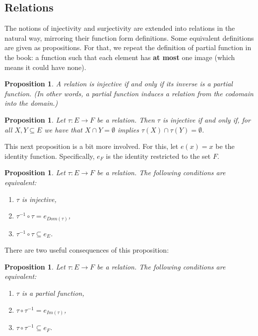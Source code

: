 \documentclass[11pt]{article}
\theoremstyle{plain}
\newtheorem{freeprop}[definition]{Proposition}
\theoremstyle{nonumberplain}
\newcommand{\inv}[1]{{#1}^{-1}}
\begin{document}
\subsection{Relations}

The notions of injectivity and surjectivity are extended into relations in the natural way, mirroring their function form definitions. Some equivalent definitions are given as propositions. For that, we repeat the definition of partial function in the book: a function such that each element has \textbf{at most} one image (which means it could have none).

\begin{freeprop}
    A relation is injective if and only if its inverse is a partial function. (In other words, a partial function induces a relation from the codomain into the domain.)
\end{freeprop}

\begin{freeprop}
    Let $\tau : E \to F$ be a relation. Then $\tau$ is injective if and only if, for all $X, Y \subseteq E$ we have that $X \cap Y = \emptyset$ implies $\tau(X) \cap \tau(Y) = \emptyset$.
\end{freeprop}

This next proposition is a bit more involved. For this, let $e(x) = x$ be the identity function. Specifically, $e_F$ is the identity restricted to the set $F$.

\begin{freeprop}
    Let $\tau : E \to F$ be a relation. The following conditions are equivalent: \begin{enumerate}
        \item $\tau$ is injective,
        \item $\inv \tau \circ \tau = e_{Dom(\tau)}$,
        \item $\inv \tau \circ \tau \subseteq e_E$.
    \end{enumerate}
\end{freeprop}

There are two useful consequences of this proposition:

\begin{freeprop}
    Let $\tau : E \to F$ be a relation. The following conditions are equivalent: \begin{enumerate}
        \item $\tau$ is a partial function,
        \item $\tau \circ \inv \tau = e_{Im(\tau)}$,
        \item $\tau \circ \inv \tau \subseteq e_F$.
    \end{enumerate}
\end{freeprop}
\end{document}
